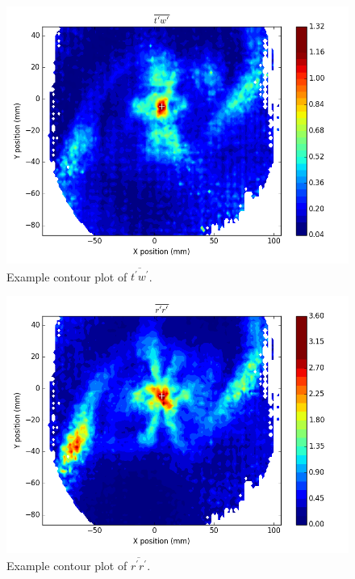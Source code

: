 {\begin{figure}[H]
	\centering
	\includegraphics[width=5in]{figs/example_vortex_figs/example_tw_contour}
\caption{Example contour plot of $\overline{t^\prime w^\prime}$.}
\label{fig:examp_tw}
\end{figure}

\begin{figure}[H]
	\centering
	\includegraphics[width=5in]{figs/example_vortex_figs/example_rr_contour}
\caption{Example contour plot of $\overline{r^\prime r^\prime}$.}
\label{fig:examp_rr}
\end{figure}

}
